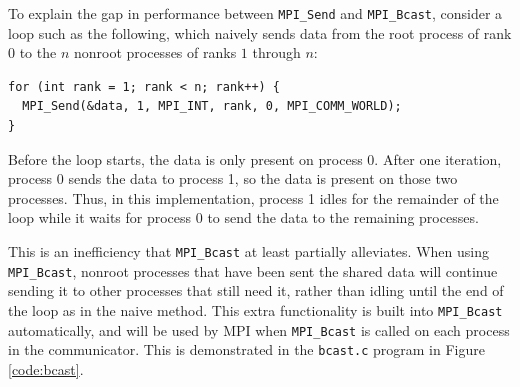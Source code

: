 \documentclass{article}
\begin{document}
To explain the gap in performance between \texttt{MPI\_Send} and \texttt{MPI\_Bcast}, consider a loop such as the following, which naively sends data from the root process of rank 0 to the $n$ nonroot processes of ranks $1$ through $n$:
\begin{verbatim}
for (int rank = 1; rank < n; rank++) {
  MPI_Send(&data, 1, MPI_INT, rank, 0, MPI_COMM_WORLD);
}
\end{verbatim}
Before the loop starts, the data is only present on process 0. After one iteration, process 0 sends the data to process 1, so the data is present on those two processes. Thus, in this implementation, process 1 idles for the remainder of the loop while it waits for process 0 to send the data to the remaining processes. 

This is an inefficiency that \texttt{MPI\_Bcast} at least partially alleviates. When using \texttt{MPI\_Bcast}, nonroot processes that have been sent the shared data will continue sending it to other processes that still need it, rather than idling until the end of the loop as in the naive method. This extra functionality is built into \texttt{MPI\_Bcast} automatically, and will be used by MPI when \texttt{MPI\_Bcast} is called on each process in the communicator. This is demonstrated in the \texttt{bcast.c} program in Figure \ref{code:bcast}.
\end{document}
